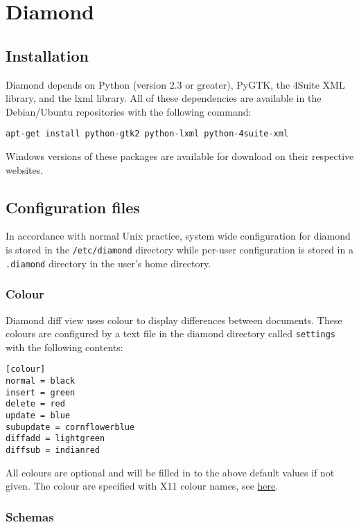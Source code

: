 ﻿\chapter{Diamond}\label{chap:diamond}

\section{Installation}
Diamond depends on Python (version 2.3 or greater), PyGTK,
the 4Suite XML library, and the lxml library. All of these dependencies
are available in the Debian/Ubuntu repositories with the following command:
\begin{verbatim}
apt-get install python-gtk2 python-lxml python-4suite-xml
\end{verbatim}

Windows versions of these packages are available for download on their respective websites.

\section{Configuration files}

In accordance with normal Unix practice, system wide configuration for
diamond is stored in the \verb+/etc/diamond+ directory while per-user
configuration is stored in a \verb+.diamond+ directory in the user's home
directory.

\subsection{Colour}\label{sec:colour}

Diamond diff view uses colour to display differences between documents.
These colours are configured by a text file in the diamond directory called \verb+settings+
with the following contents:
\begin{verbatim}
[colour]
normal = black
insert = green
delete = red
update = blue
subupdate = cornflowerblue
diffadd = lightgreen
diffsub = indianred
\end{verbatim}
All colours are optional and will be filled in to the above default values if not given.
The colour are specified with X11 colour names, see \href{http://en.wikipedia.org/wiki/X11_color_names}{here}.

\subsection{Schemas}

